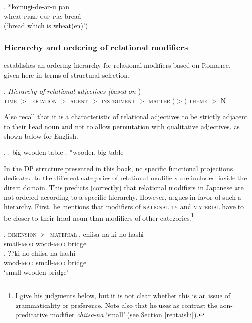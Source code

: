 \exg. *komugi-de-ar-u pan\\
wheat-\textsc{pred-cop-prs} bread\\
(`bread which is wheat(en)’) \label{komugi dearu}

\subsubsection{Hierarchy and ordering of relational modifiers}

\citet{bortolotto:2016:RA} establishes an ordering hierarchy for relational modifiers based on Romance, given here in terms of structural selection.

\ex. \emph{Hierarchy of relational adjectives (based on \citealt[180]{bortolotto:2016:RA}})\\
\textsc{time} $>$ \textsc{location} $>$ \textsc{agent} $>$ \textsc{instrument} $>$ \textsc{matter} ($>$) \textsc{theme} $>$ N

Also recall that it is a characteristic of relational adjectives to be strictly adjacent to their head noun and not to allow permutation with qualitative adjectives, as shown below for  English.

\ex. \a. big wooden table
\b. *wooden big table \null \hfill \citep[66]{bisetto:2010:RA}

In the DP structure presented in this book, no specific functional projections dedicated to the different categories of relational modifiers are included inside the direct domain. This predicts (correctly) that relational modifiers in Japanese are not ordered according to a specific hierarchy. However, \citet{watanabe:2012:direct} argues in favor of such a hierarchy. First, he mentions that modifiers of \textsc{nationality} and \textsc{material} have to be closer to their head noun than modifiers of other categories.\footnote{I give his judgments below, but it is not clear whether this is an issue of grammaticality or preference. Note also that he uses as contrast the non-predicative modifier \textit{chiisa-na} `small' (see Section \ref{rentaishi}).}

\ex. \textsc{dimension} $\succ$ \textsc{material}
\label{chiisa1} \ag. chiisa-na ki-no hashi\\
small-\textsc{mod} wood-\textsc{mod} bridge\\
\bg. ??ki-no chiisa-na hashi\\
wood-\textsc{mod} small-\textsc{mod} bridge\\
`small wooden bridge' \hfill \citep[507]{watanabe:2012:direct}

